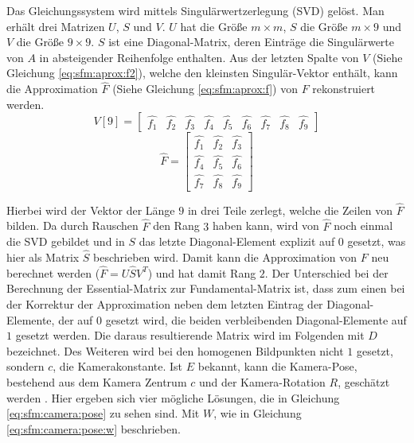 \documentclass[12pt,titlepage, twoside]{article}
\begin{document}
Das Gleichungssystem wird mittels Singulärwertzerlegung (SVD) gelöst. Man erhält drei Matrizen $U$, $S$ und $V$. $U$ hat die Größe $m\times m$, $S$ die Größe $m\times 9$ und $V$ die Größe $9\times 9$.
$S$ ist eine Diagonal-Matrix, deren Einträge die Singulärwerte von $A$ in absteigender Reihenfolge enthalten.
Aus der letzten Spalte von $V$ (Siehe Gleichung \ref{eq:sfm:aprox:f2}), welche den kleinsten Singulär-Vektor enthält, kann die Approximation $\hat{F}$ (Siehe Gleichung \ref{eq:sfm:aprox:f}) von $F$ rekonstruiert werden. 
\begin{equation}
    \label{eq:sfm:aprox:f2}
    V[9] = \begin{bmatrix}
        \hat{f_1} & \hat{f_2} & \hat{f_3} & \hat{f_4} & \hat{f_5} & \hat{f_6} & \hat{f_7} & \hat{f_8} & \hat{f_9}
    \end{bmatrix}
\end{equation}
\begin{equation}
    \label{eq:sfm:aprox:f}
    \hat{F}=\begin{bmatrix}
        \hat{f_1} & \hat{f_2} & \hat{f_3}\\
        \hat{f_4} & \hat{f_5} & \hat{f_6}\\
        \hat{f_7} & \hat{f_8} & \hat{f_9}
    \end{bmatrix}
\end{equation}

Hierbei wird der Vektor der Länge $9$ in drei Teile zerlegt, welche die Zeilen von $\hat{F}$ bilden. 
Da durch Rauschen $\hat{F}$ den Rang $3$ haben kann, wird von $\hat{F}$ noch einmal die SVD gebildet und in $S$ das letzte Diagonal-Element explizit auf $0$ gesetzt, was hier als Matrix $\hat{S}$ beschrieben wird.
Damit kann die Approximation von $F$ neu berechnet werden ($\hat{F} = U\hat{S}V^T$) und hat damit Rang $2$.
Der Unterschied bei der Berechnung der Essential-Matrix zur Fundamental-Matrix ist, dass zum einen bei der Korrektur der Approximation neben dem letzten Eintrag der Diagonal-Elemente, der auf $0$ gesetzt wird, 
die beiden verbleibenden Diagonal-Elemente auf $1$ gesetzt werden. Die daraus resultierende Matrix wird im Folgenden mit $D$ bezeichnet. 
Des Weiteren wird bei den homogenen Bildpunkten nicht $1$ gesetzt, sondern $c$, die Kamerakonstante.
Ist $E$ bekannt, kann die Kamera-Pose, bestehend aus dem Kamera Zentrum $c$ und der Kamera-Rotation $R$, geschätzt werden \cite{sfm2}.
Hier ergeben sich vier mögliche Lösungen, die in Gleichung \ref{eq:sfm:camera:pose} zu sehen sind. Mit $W$, wie in Gleichung \ref{eq:sfm:camera:pose:w} beschrieben.
\end{document}
